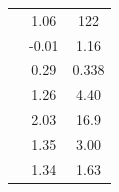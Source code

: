 \documentclass[]{tufte-handout}
\begin{document}
\begin{table}[h!]
\begin{tabular}{lSS}
         &           1.06 &    122            \\ 
        &          -0.01 &      1.16         \\ 
        &           0.29 &      0.338        \\ 
         &           1.26 &      4.40         \\ 
        &           2.03 &     16.9          \\ 
         &           1.35 &      3.00         \\ 
          &           1.34 &      1.63         \\ 
    \end{tabular}
    \label{tab:rates2}
\end{table}


\nobibliography{}
\end{document}
